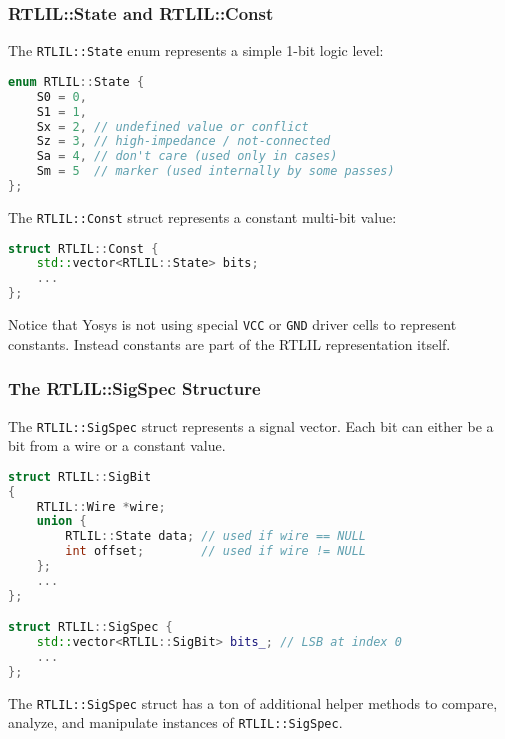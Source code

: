 \subsubsection{RTLIL::State and RTLIL::Const}

\begin{frame}[t, fragile]{\subsubsecname}
The {\tt RTLIL::State} enum represents a simple 1-bit logic level:

\smallskip
\begin{lstlisting}[xleftmargin=1cm, basicstyle=\ttfamily\fontsize{8pt}{10pt}\selectfont, language=C++]
enum RTLIL::State {
    S0 = 0,
    S1 = 1,
    Sx = 2, // undefined value or conflict
    Sz = 3, // high-impedance / not-connected
    Sa = 4, // don't care (used only in cases)
    Sm = 5  // marker (used internally by some passes)
};
\end{lstlisting}

\bigskip
The {\tt RTLIL::Const} struct represents a constant multi-bit value:

\smallskip
\begin{lstlisting}[xleftmargin=1cm, basicstyle=\ttfamily\fontsize{8pt}{10pt}\selectfont, language=C++]
struct RTLIL::Const {
    std::vector<RTLIL::State> bits;
    ...
};
\end{lstlisting}

\bigskip
Notice that Yosys is not using special {\tt VCC} or {\tt GND} driver cells to represent constants. Instead
constants are part of the RTLIL representation itself.
\end{frame}

\subsubsection{The RTLIL::SigSpec Structure}

\begin{frame}[t, fragile]{\subsubsecname}
The {\tt RTLIL::SigSpec} struct represents a signal vector. Each bit can either be a bit from a wire
or a constant value.

\bigskip
\begin{lstlisting}[xleftmargin=1cm, basicstyle=\ttfamily\fontsize{8pt}{10pt}\selectfont, language=C++]
struct RTLIL::SigBit
{
    RTLIL::Wire *wire;
    union {
        RTLIL::State data; // used if wire == NULL
        int offset;        // used if wire != NULL
    };
    ...
};

struct RTLIL::SigSpec {
    std::vector<RTLIL::SigBit> bits_; // LSB at index 0
    ...
};
\end{lstlisting}

\bigskip
The {\tt RTLIL::SigSpec} struct has a ton of additional helper methods to compare, analyze, and
manipulate instances of {\tt RTLIL::SigSpec}.
\end{frame}

